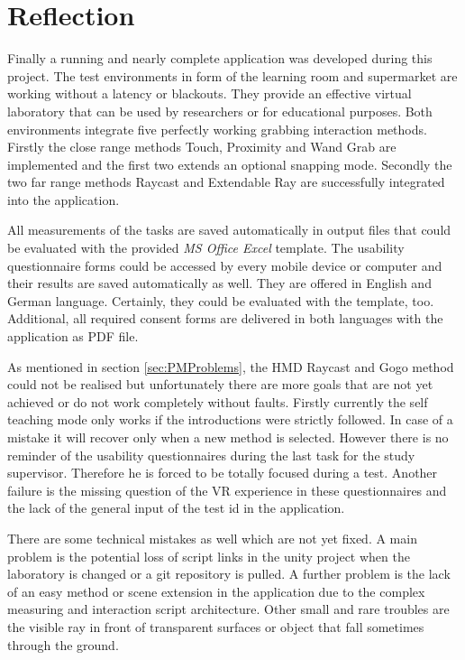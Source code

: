 \section{Reflection} \label{sec:Reflexion}

Finally a running and nearly complete application was developed during this project.
The test environments in form of the learning room and supermarket are working without a latency or blackouts. They provide an effective virtual laboratory that can be used by researchers or for educational purposes. Both environments integrate five perfectly working grabbing interaction methods. Firstly the close range methods Touch, Proximity and Wand Grab are implemented and the first two extends an optional snapping mode. Secondly the two far range methods Raycast and Extendable Ray are successfully integrated into the application.
 
All measurements of the tasks are saved automatically in output files that could be evaluated with the provided \textit{MS Office Excel} template. The usability questionnaire forms could be accessed by every mobile device or computer and their results are saved automatically as well. They are offered in English and German language. Certainly, they could be evaluated with the template, too. Additional, all required consent forms are delivered in both languages with the application as PDF file.

As mentioned in section \ref{sec:PMProblems}, the HMD Raycast and Gogo method could not be realised but unfortunately there are more goals that are not yet achieved or do not work completely without faults. Firstly currently the self teaching mode only works if the introductions were strictly followed. In case of a mistake it will recover only when a new method is selected. However there is no reminder of the usability questionnaires during the last task for the study supervisor. Therefore he is forced to be totally focused during a test. Another failure is the missing question of the VR experience in these questionnaires and the lack of the general input of the test id in the application.

There are some technical mistakes as well which are not yet fixed. A main problem is the potential loss of script links in the unity project when the laboratory is changed or a git repository is pulled. A further problem is the lack of an easy method or scene extension in the application due to the complex measuring and interaction script architecture. Other small and rare troubles are the visible ray in front of transparent surfaces or object that fall sometimes through the ground.

\newpage

























